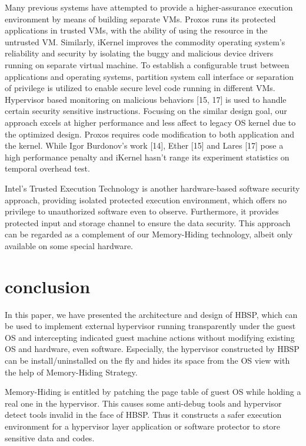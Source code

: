 \documentclass[conference]{IEEEtran}
\begin{document}
{Many previous systems have attempted to provide a higher-assurance
execution environment by means of building separate VMs.
Proxos\cite{IEEEhowto:12} runs its protected applications in
trusted VMs, with the ability of using the resource in the
untrusted VM. Similarly, iKernel\cite{IEEEhowto:13} improves the
commodity operating system's reliability and security by isolating
the buggy and malicious device drivers running on separate virtual
machine. To establish a configurable trust between applications
and operating systems, partition system call interface  or
separation of privilege\cite{IEEEhowto:15} is utilized to enable
secure level code running in different VMs. Hypervisor based
monitoring on malicious behaviors [15, 17] is used to handle
certain security sensitive instructions. Focusing on the similar
design goal, our approach excels at higher performance and less
affect to legacy OS kernel due to the optimized design. Proxos
\cite{IEEEhowto:12} requires code modification to both application
and the kernel. While Igor Burdonov's work [14], Ether [15] and
Lares [17] pose a high performance penalty and iKernel
\cite{IEEEhowto:13} hasn't range its experiment statistics on
temporal overhead test.

Intel's Trusted Execution Technology\cite{IEEEhowto:17} is another
hardware-based software security approach, providing isolated
protected execution environment, which offers no privilege to
unauthorized software even to observe. Furthermore, it provides
protected input and storage channel to ensure the data security.
This approach can be regarded as a complement of our Memory-Hiding
technology, albeit only available on some special hardware.

\bigskip

\section{conclusion}
In this paper, we have presented the architecture and design of
HBSP, which can be used to implement external hypervisor running
transparently under the guest OS and intercepting indicated guest
machine actions without modifying existing OS and hardware, even
software. Especially, the hypervisor constructed by HBSP can be
install/uninstalled on the fly and hides its space from the OS
view with the help of Memory-Hiding Strategy.

Memory-Hiding is entitled by patching the page table of guest OS
while holding a real one in the hypervisor. This causes some
anti-debug tools and hypervisor detect tools invalid in the face
of HBSP. Thus it constructs a safer execution environment for a
hypervisor layer application or software protector to store
sensitive data and codes.

}
\end{document}
